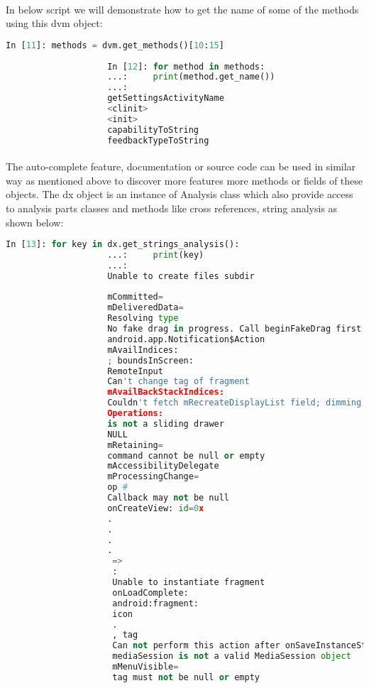 \documentclass[../main.tex]{subfile}
\begin{document}
			\paragraph{} In below script we will demonstrate how to get the name of some of the methods using this dvm object:
				\begin{lstlisting}[language=python, firstnumber=41]
					In [11]: methods = dvm.get_methods()[10:15]
					
					In [12]: for method in methods:
					...:     print(method.get_name())
					...:     
					getSettingsActivityName
					<clinit>
					<init>
					capabilityToString
					feedbackTypeToString
				\end{lstlisting}
				
			\paragraph{} The auto-complete feature, documentation or source code can be used in similar way as mentioned above to discover more features more methods or fields of these objects. The dx object is an instance of Analysis class which also provide access to analysis parts classes and methods like cross references, string analysis as shown below:
				\begin{lstlisting}[language=python, firstnumber=51]
					In [13]: for key in dx.get_strings_analysis():
					...:     print(key)
					...:     
					Unable to create files subdir 
					
					mCommitted=
					mDeliveredData=
					Resolving type 
					No fake drag in progress. Call beginFakeDrag first.
					android.app.Notification$Action
					mAvailIndices: 
					; boundsInScreen: 
					RemoteInput
					Can't change tag of fragment 
					mAvailBackStackIndices: 
					Couldn't fetch mRecreateDisplayList field; dimming will be slow.
					Operations:
					is not a sliding drawer
					NULL
					mRetaining=
					command cannot be null or empty
					mAccessibilityDelegate
					mProcessingChange=
					op #
					Callback may not be null
					onCreateView: id=0x
					.
					.
					.
					.
					 => 
					 : 
					 Unable to instantiate fragment 
					 onLoadComplete: 
					 android:fragment:
					 icon
					 .
					 , tag 
					 Can not perform this action after onSaveInstanceState
					 mediaSession is not a valid MediaSession object
					 mMenuVisible=
					 tag must not be null or empty
					 
				\end{lstlisting}
\end{document}

